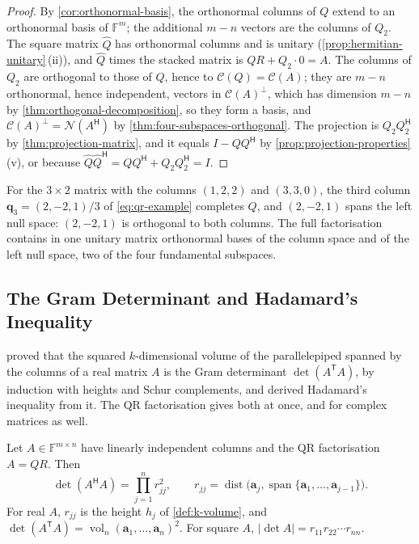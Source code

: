 \begin{proof}
By \cref{cor:orthonormal-basis}, the orthonormal columns of $Q$ extend to an orthonormal basis of $\mathbb F^m$; the additional $m-n$ vectors are the columns of $Q_2$. The square matrix $\hat Q$ has orthonormal columns and is unitary (\cref{prop:hermitian-unitary}\,(ii)), and $\hat Q$ times the stacked matrix is $QR+Q_2\cdot0=A$. The columns of $Q_2$ are orthogonal to those of $Q$, hence to $\mathcal C(Q)=\mathcal C(A)$; they are $m-n$ orthonormal, hence independent, vectors in $\mathcal C(A)^\perp$, which has dimension $m-n$ by \cref{thm:orthogonal-decomposition}, so they form a basis, and $\mathcal C(A)^\perp=\mathcal N(A^{\mathsf H})$ by \cref{thm:four-subspaces-orthogonal}. The projection is $Q_2Q_2^{\mathsf H}$ by \cref{thm:projection-matrix}, and it equals $I-QQ^{\mathsf H}$ by \cref{prop:projection-properties}\,(v), or because $\hat Q\hat Q^{\mathsf H}=QQ^{\mathsf H}+Q_2Q_2^{\mathsf H}=I$.
\end{proof}

For the $3\times2$ matrix with the columns $(1,2,2)$ and $(3,3,0)$, the third column $\mathbf q_3=(2,-2,1)/3$ of \eqref{eq:qr-example} completes $Q$, and $(2,-2,1)$ spans the left null space: $(2,-2,1)$ is orthogonal to both columns. The full factorisation contains in one unitary matrix orthonormal bases of the column space and of the left null space, two of the four fundamental subspaces.

\subsection{The Gram Determinant and Hadamard's Inequality}

 proved that the squared $k$-dimensional volume of the parallelepiped spanned by the columns of a real matrix $A$ is the Gram determinant $\det(A^{\mathsf T}A)$, by induction with heights and Schur complements, and derived Hadamard's inequality from it. The QR factorisation gives both at once, and for complex matrices as well.

\begin{theorem}
\label{thm:gram-qr}
Let $A\in\mathbb F^{m\times n}$ have linearly independent columns and the QR factorisation $A=QR$. Then
\[
\det(A^{\mathsf H}A)=\prod_{j=1}^nr_{jj}^2,\qquad r_{jj}=\operatorname{dist}\bigl(\mathbf a_j,\operatorname{span}\{\mathbf a_1,\ldots,\mathbf a_{j-1}\}\bigr).
\]
For real $A$, $r_{jj}$ is the height $h_j$ of \cref{def:k-volume}, and $\det(A^{\mathsf T}A)=\operatorname{vol}_n(\mathbf a_1,\ldots,\mathbf a_n)^2$. For square $A$, $|\det A|=r_{11}r_{22}\cdots r_{nn}$.
\end{theorem}

